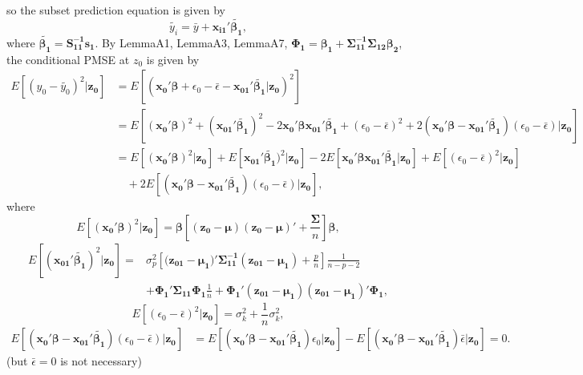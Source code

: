 so the subset prediction equation is given by $$\tilde{y_i}=\bar{y}+\boldsymbol{x_{i1}'\tilde{\beta_1}},$$ where $\boldsymbol{\tilde{\beta_1}=S_{11}^{-1}s_1}$. By LemmaA1, LemmaA3, LemmaA7, $\boldsymbol{\Phi_1=\beta_1+\Sigma^{-1}_{11}\Sigma_{12}\beta_2}$, the conditional PMSE at $z_0$ is given by 
$$
\begin{aligned}
E[(y_0-\tilde{y_0})^2|\boldsymbol{z_0}]
&=E[(\boldsymbol{x_{0}'\beta}+\epsilon_0-\bar{\epsilon}-\boldsymbol{x_{01}'\tilde{\beta_1}}|\boldsymbol{z_0})^2]\\
&= E[(\boldsymbol{x_0'\beta})^2+(\boldsymbol{x_{01}'\tilde{\beta_1}})^2-2\boldsymbol{x_0'\beta x_{01}'\tilde{\beta_1}}+(\epsilon_0-\bar{\epsilon})^2+2(\boldsymbol{x_0'\beta-x_{01}'\tilde{\beta_1}})(\epsilon_0-\bar{\epsilon})|\boldsymbol{z_0}]\\
&= E[(\boldsymbol{x_0'\beta})^2|\boldsymbol{z_0}]+E[\boldsymbol{x_{01}'\tilde{\beta_1}})^2|\boldsymbol{z_0}]-2E[\boldsymbol{x_0'\beta x_{01}'\tilde{\beta_1}|z_0}]+E[(\epsilon_0-\bar{\epsilon})^2|\boldsymbol{z_0}]\\
&\quad+2E[(\boldsymbol{x_0'\beta-x_{01}'\tilde{\beta_1}})(\epsilon_0-\bar{\epsilon})|\boldsymbol{z_0}],
\end{aligned}$$
where 
$$E[(\boldsymbol{x_0'\beta})^2|\boldsymbol{z_0}]=\boldsymbol{\beta}\left[\boldsymbol{(z_0-\mu)(z_0-\mu)'}+\frac{\boldsymbol{\Sigma}}{n}\right]\boldsymbol{\beta},$$
$$\begin{aligned}E[(\boldsymbol{x_{01}'\tilde{\beta_1}})^2|\boldsymbol{z_0}]
=&\sigma_p^2 \left[(\boldsymbol{z_{01}-\mu_1)'\Sigma_{11}^{-1}(z_{01}-\mu_1)}+\frac{p}{n}\right]\frac{1}{n-p-2}\\
&+\boldsymbol{\Phi_1'\Sigma_{11}\Phi_1}\frac{1}{n}+\boldsymbol{\Phi_{1}'(z_{01}-\mu_{1})(z_{01}-\mu_1)'\Phi_1},\label{LemmaA7}
\end{aligned}
$$
$$E[(\epsilon_0-\bar{\epsilon})^2|\boldsymbol{z_0}]=\sigma_k^2+\frac{1}{n}\sigma_k^2,$$
$$\begin{aligned}
E[(\boldsymbol{x_0'\beta-x_{01}'\tilde{\beta_1}})(\epsilon_0-\bar{\epsilon})|\boldsymbol{z_0}]
&=E[(\boldsymbol{x_0'\beta-x_{01}'\tilde{\beta_1}})\epsilon_0|\boldsymbol{z_0}]-E[(\boldsymbol{x_0'\beta-x_{01}'\tilde{\beta_1}})\bar{\epsilon}|\boldsymbol{z_0}]=0.
\end{aligned}$$
(but $\bar{\epsilon}=0$ is not necessary)

